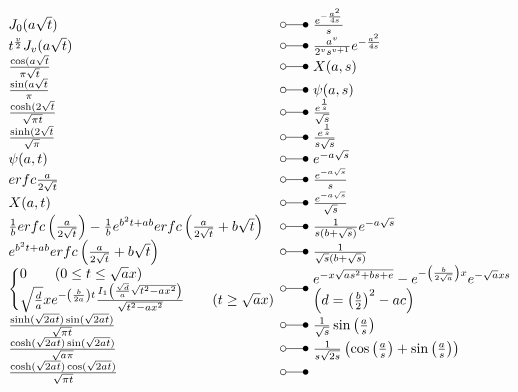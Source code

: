 \begin{footnotesize}
\[ \begin{array}{@{}l@{ ~ \laplace ~ }l@{}}
J_0(a \sqrt{t}) &
    \frac{e^{-\frac{a^2}{4s}}}{s} \\
t^{\frac{v}{2}} J_v(a\sqrt{t}) &
    \frac{a^v}{2^v s^{v + 1}} e^{-\frac{a^2}{4s}} \\
\frac{\cos(a\sqrt{t}}{\pi \sqrt{t}} &
    X(a, s) \\
\frac{\sin(a \sqrt{t}}{\pi} &
    \psi(a, s) \\
\frac{\cosh(2 \sqrt{t}}{\sqrt{\pi t}} &
    \frac{e^{\frac{1}{s}}}{\sqrt{s}} \\
\frac{\sinh(2 \sqrt{t}}{\sqrt{\pi}} &
    \frac{e^{\frac{1}{s}}}{s \sqrt{s}} \\
\psi(a, t) &
    e^{- a \sqrt{s}} \\
erfc \frac{a}{2 \sqrt{t}} &
    \frac{e^{- a \sqrt{s}}}{s} \\
X(a, t) &
    \frac{e^{- a \sqrt{s}}}{\sqrt{s}} \\
\frac{1}{b} erfc\left(\frac{a}{2 \sqrt{t}}\right) - \frac{1}{b} e^{b^2 t + ab} erfc\left(\frac{a}{2 \sqrt{t}} + b \sqrt{t}\right) &
    \frac{1}{s (b + \sqrt{s})} e^{-a \sqrt{s}} \\
e^{b^2 t + ab} erfc\left(\frac{a}{2 \sqrt{t}} + b \sqrt{t}\right) &
    \frac{1}{\sqrt{s} (b + \sqrt{s})} \\
\left\lbrace\begin{array}{@{}l@{}}
0 \qquad (0 \leq t \leq \sqrt{a}x) \\
\sqrt{\frac{d}{a}} x e^{-\left(\frac{b}{2a}\right)t} \frac{I_1\left(\frac{\sqrt{d}}{a} \sqrt{t^2 - a x^2}\right)}{\sqrt{t^2 - a x^2}} \qquad (t \geq \sqrt{a}x) \\
\end{array}\right. &
    \begin{array}{@{}l@{}}
    e^{-x \sqrt{a s^2 + bs + e}} - e^{-\left(\frac{b}{2 \sqrt{a}}\right)x} e^{-\sqrt{a}xs} \\
    \left(d = \left(\frac{b}{2}\right)^2 - ac\right)
    \end{array} \\
\frac{\sinh(\sqrt{2 at}) \sin(\sqrt{2 at})}{\sqrt{\pi t}} &
    \frac{1}{\sqrt{s}} \sin\left(\frac{a}{s}\right) \\
\frac{\cosh(\sqrt{2 at}) \sin(\sqrt{2 at})}{\sqrt{a \pi}} &
    \frac{1}{s \sqrt{2 s}} \left(\cos\left(\frac{a}{s}\right) + \sin\left(\frac{a}{s}\right)\right) \\
\frac{\cosh(\sqrt{2 at}) \cos(\sqrt{2 at})}{\sqrt{\pi t}} &

\end{array}\]
\end{footnotesize}
